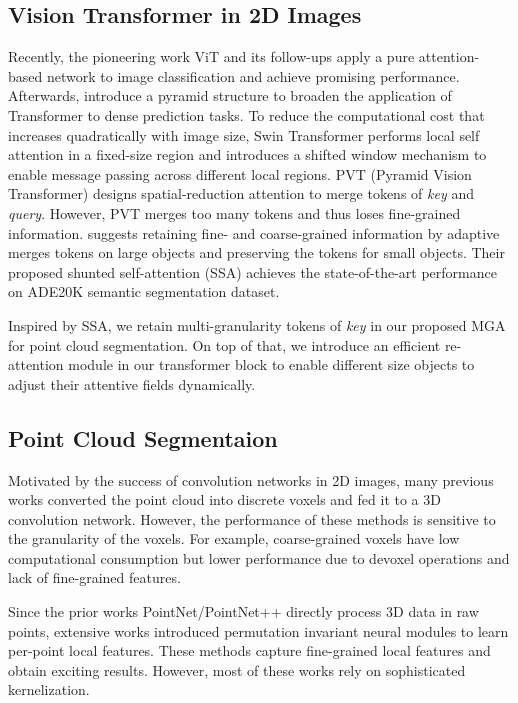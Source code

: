 \documentclass[10pt,twocolumn,letterpaper]{article}
\begin{document}
\subsection{Vision Transformer in 2D Images}
Recently, the pioneering work ViT\cite{ViT2020} and its follow-ups\cite{vittraining2d2021,vittoken2d2021,vitin2d2021,vitDo2d2021} apply a pure attention-based network to image classification and achieve promising performance. Afterwards, \cite{pvt2D2021,swin2d2021} introduce a pyramid structure to broaden the application of Transformer to dense prediction tasks. To reduce the computational cost that increases quadratically with image size, Swin Transformer\cite{swin2d2021} performs local self attention in a fixed-size region and introduces a shifted window mechanism to enable message passing across different local regions. PVT (Pyramid Vision Transformer)\cite{pvt2D2021} designs spatial-reduction attention to merge tokens of \textit{key} and \textit{query}. However, PVT merges too many tokens and thus loses fine-grained information. \cite{shunted2d2022} suggests retaining fine- and coarse-grained information by adaptive merges tokens on large objects and preserving the tokens for small objects. Their proposed shunted self-attention (SSA) achieves the state-of-the-art performance on ADE20K\cite{ADE20K2017} semantic segmentation dataset. 


Inspired by SSA\cite{shunted2d2022}, we retain multi-granularity tokens of \textit{key} in our proposed MGA for point cloud segmentation. On top of that, we introduce an efficient re-attention module in our transformer block to enable different size objects to adjust their attentive fields dynamically.
\subsection{Point Cloud Segmentaion}

Motivated by the success of convolution networks in 2D images, many previous works\cite{boulch2017unstructured, SparseConvNet2018, rethage2018fully, vvnet2019} converted the point cloud into discrete voxels and fed it to a 3D convolution network. However, the performance of these methods is sensitive to the granularity of the voxels. For example, coarse-grained voxels have low computational consumption but lower performance due to devoxel operations and lack of fine-grained features.

Since the prior works PointNet/PointNet++\cite{pointnet,pointnet2} directly process 3D data in raw points, extensive works\cite{sonet,pointweb,pccn,pointconv,ecc,gacnet,kpconv,randlanet,scf2021,pcan,boundary-aware2021} introduced permutation invariant neural modules to learn per-point local features. These methods capture fine-grained local features and obtain exciting results. However, most of these works rely on sophisticated kernelization. 
\end{document}
